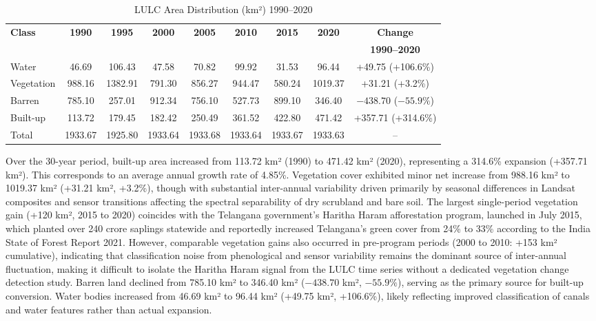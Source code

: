 \documentclass[12pt,a4paper]{article}
\begin{document}
\begin{table}[H]
\caption{LULC Area Distribution (km²) 1990--2020}
\label{tab:lulc_areas}
\centering
\small
\renewcommand{\arraystretch}{1.2}
\begin{tabular}{lcccccccc}
\toprule
\textbf{Class} & \textbf{1990} & \textbf{1995} & \textbf{2000} & \textbf{2005} & \textbf{2010} & \textbf{2015} & \textbf{2020} & \textbf{Change} \\
 & & & & & & & & \textbf{1990--2020} \\
\midrule
Water & 46.69 & 106.43 & 47.58 & 70.82 & 99.92 & 31.53 & 96.44 & +49.75 (+106.6\%) \\
Vegetation & 988.16 & 1382.91 & 791.30 & 856.27 & 944.47 & 580.24 & 1019.37 & +31.21 (+3.2\%) \\
Barren & 785.10 & 257.01 & 912.34 & 756.10 & 527.73 & 899.10 & 346.40 & $-438.70$ ($-55.9\%$) \\
Built-up & 113.72 & 179.45 & 182.42 & 250.49 & 361.52 & 422.80 & 471.42 & +357.71 (+314.6\%) \\
\midrule
Total & 1933.67 & 1925.80 & 1933.64 & 1933.68 & 1933.64 & 1933.67 & 1933.63 & -- \\
\bottomrule
\end{tabular}
\end{table}

Over the 30-year period, built-up area increased from 113.72 km² (1990) to 471.42 km² (2020), representing a 314.6\% expansion (+357.71 km²). This corresponds to an average annual growth rate of 4.85\%. Vegetation cover exhibited minor net increase from 988.16 km² to 1019.37 km² (+31.21 km², +3.2\%), though with substantial inter-annual variability driven primarily by seasonal differences in Landsat composites and sensor transitions affecting the spectral separability of dry scrubland and bare soil. The largest single-period vegetation gain (+120 km², 2015 to 2020) coincides with the Telangana government's Haritha Haram afforestation program, launched in July 2015, which planted over 240 crore saplings statewide and reportedly increased Telangana's green cover from 24\% to 33\% according to the India State of Forest Report 2021. However, comparable vegetation gains also occurred in pre-program periods (2000 to 2010: +153 km² cumulative), indicating that classification noise from phenological and sensor variability remains the dominant source of inter-annual fluctuation, making it difficult to isolate the Haritha Haram signal from the LULC time series without a dedicated vegetation change detection study. Barren land declined from 785.10 km² to 346.40 km² ($-438.70$ km², $-55.9\%$), serving as the primary source for built-up conversion. Water bodies increased from 46.69 km² to 96.44 km² (+49.75 km², +106.6\%), likely reflecting improved classification of canals and water features rather than actual expansion.
\end{document}
